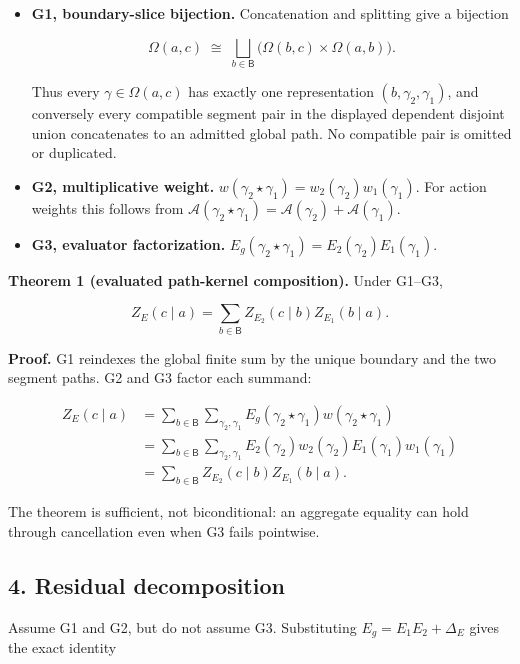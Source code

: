\documentclass[
  11pt,
]{article}
\theoremstyle{plain}
\theoremstyle{definition}\newtheorem{definition}[theorem]{Definition}
\theoremstyle{remark}\newtheorem*{remark}{Remark}
\begin{document}
\begin{itemize}
\item
  \textbf{G1, boundary-slice bijection.} Concatenation and splitting give a
  bijection

  \[
  \Omega(a,c)\;\cong\;
  \bigsqcup_{b\in\mathsf B}
  \bigl(\Omega(b,c)\times\Omega(a,b)\bigr).
  \]

  Thus every \(\gamma\in\Omega(a,c)\) has exactly one representation
  \((b,\gamma_2,\gamma_1)\), and conversely every compatible segment pair in
  the displayed dependent disjoint union concatenates to an admitted global
  path. No compatible pair is omitted or duplicated.
\item
  \textbf{G2, multiplicative weight.}
  \(w(\gamma_2\star\gamma_1)=w_2(\gamma_2)w_1(\gamma_1)\).
  For action weights this follows from
  \(\mathcal A(\gamma_2\star\gamma_1)
    =\mathcal A(\gamma_2)+\mathcal A(\gamma_1)\).
\item
  \textbf{G3, evaluator factorization.}
  \(E_g(\gamma_2\star\gamma_1)=E_2(\gamma_2)E_1(\gamma_1)\).
\end{itemize}

\textbf{Theorem 1 (evaluated path-kernel composition).} Under G1--G3,

\[
Z_E(c\mid a)
=\sum_{b\in\mathsf B}Z_{E_2}(c\mid b)Z_{E_1}(b\mid a).
\]

\textbf{Proof.} G1 reindexes the global finite sum by the unique boundary and the
two segment paths. G2 and G3 factor each summand:

\[
\begin{aligned}
Z_E(c\mid a)
&=\sum_{b\in\mathsf B}
  \sum_{\gamma_2,\gamma_1}
  E_g(\gamma_2\star\gamma_1)
  w(\gamma_2\star\gamma_1)\\
&=\sum_{b\in\mathsf B}
  \sum_{\gamma_2,\gamma_1}
  E_2(\gamma_2)w_2(\gamma_2)
  E_1(\gamma_1)w_1(\gamma_1)\\
&=\sum_{b\in\mathsf B}
  Z_{E_2}(c\mid b)Z_{E_1}(b\mid a).
\end{aligned}
\]

The theorem is sufficient, not biconditional: an aggregate equality can hold
through cancellation even when G3 fails pointwise.

\subsection{4. Residual decomposition}\label{residual-decomposition}

Assume G1 and G2, but do not assume G3. Substituting
\(E_g=E_1E_2+\Delta_E\) gives the exact identity
\end{document}
